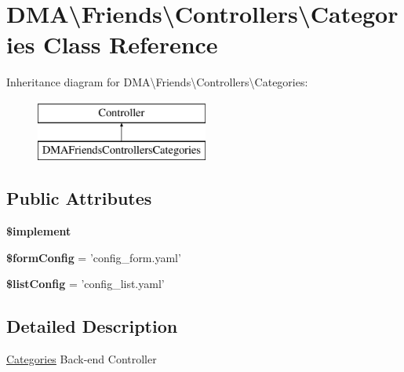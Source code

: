 \hypertarget{classDMA_1_1Friends_1_1Controllers_1_1Categories}{\section{D\+M\+A\textbackslash{}Friends\textbackslash{}Controllers\textbackslash{}Categories Class Reference}
\label{classDMA_1_1Friends_1_1Controllers_1_1Categories}
}
Inheritance diagram for D\+M\+A\textbackslash{}Friends\textbackslash{}Controllers\textbackslash{}Categories\+:\begin{figure}[H]
\begin{center}
\leavevmode
\includegraphics[height=2.000000cm]{d9/daa/classDMA_1_1Friends_1_1Controllers_1_1Categories}
\end{center}
\end{figure}
\subsection*{Public Attributes}
\begin{DoxyCompactItemize}
\item 
{\bfseries \$implement}
\item 
\hypertarget{classDMA_1_1Friends_1_1Controllers_1_1Categories_a7703e05040f63ca4879a67fa7f012505}{{\bfseries \$form\+Config} = 'config\+\_\+form.\+yaml'}\label{classDMA_1_1Friends_1_1Controllers_1_1Categories_a7703e05040f63ca4879a67fa7f012505}

\item 
\hypertarget{classDMA_1_1Friends_1_1Controllers_1_1Categories_a582b40a4ad8ec8bc87d37f6de0a79281}{{\bfseries \$list\+Config} = 'config\+\_\+list.\+yaml'}\label{classDMA_1_1Friends_1_1Controllers_1_1Categories_a582b40a4ad8ec8bc87d37f6de0a79281}

\end{DoxyCompactItemize}


\subsection{Detailed Description}
\hyperlink{classDMA_1_1Friends_1_1Controllers_1_1Categories}{Categories} Back-\/end Controller 

